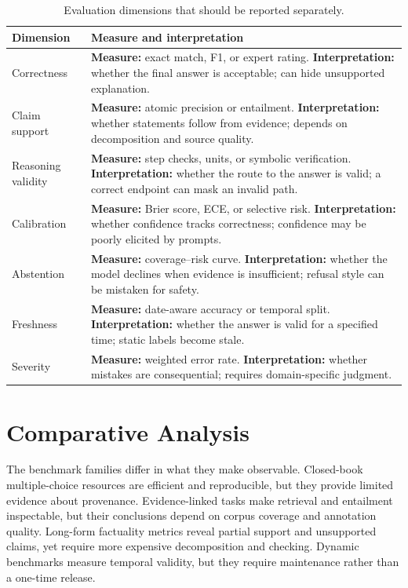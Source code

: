 \documentclass[manuscript,nonacm]{acmart}
\begin{document}
\begin{table}[t]
\caption{Evaluation dimensions that should be reported separately.}
\label{tab:dimensions}
\small
\setlength{\tabcolsep}{3pt}
\begin{tabularx}{\linewidth}{p{2.0cm}Y}
\toprule
\textbf{Dimension} & \textbf{Measure and interpretation}\\
\midrule
Correctness & \textbf{Measure:} exact match, F1, or expert rating. \textbf{Interpretation:} whether the final answer is acceptable; can hide unsupported explanation.\\
Claim support & \textbf{Measure:} atomic precision or entailment. \textbf{Interpretation:} whether statements follow from evidence; depends on decomposition and source quality.\\
Reasoning validity & \textbf{Measure:} step checks, units, or symbolic verification. \textbf{Interpretation:} whether the route to the answer is valid; a correct endpoint can mask an invalid path.\\
Calibration & \textbf{Measure:} Brier score, ECE, or selective risk. \textbf{Interpretation:} whether confidence tracks correctness; confidence may be poorly elicited by prompts.\\
Abstention & \textbf{Measure:} coverage--risk curve. \textbf{Interpretation:} whether the model declines when evidence is insufficient; refusal style can be mistaken for safety.\\
Freshness & \textbf{Measure:} date-aware accuracy or temporal split. \textbf{Interpretation:} whether the answer is valid for a specified time; static labels become stale.\\
Severity & \textbf{Measure:} weighted error rate. \textbf{Interpretation:} whether mistakes are consequential; requires domain-specific judgment.\\
\bottomrule
\end{tabularx}
\end{table}

\section{Comparative Analysis}\label{sec:comparison}
The benchmark families differ in what they make observable. Closed-book multiple-choice resources are efficient and reproducible, but they provide limited evidence about provenance. Evidence-linked tasks make retrieval and entailment inspectable, but their conclusions depend on corpus coverage and annotation quality. Long-form factuality metrics reveal partial support and unsupported claims, yet require more expensive decomposition and checking. Dynamic benchmarks measure temporal validity, but they require maintenance rather than a one-time release.
\end{document}
